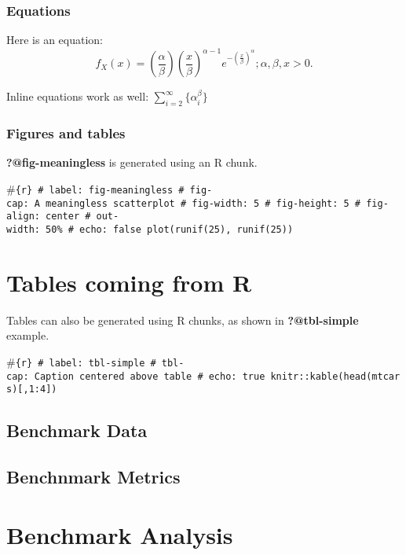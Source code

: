 \documentclass[
  11pt,
  authoryear,
  preprint]{elsarticle}
\begin{document}
\subsubsection{Equations}\label{equations}

Here is an equation: \[ 
  f_{X}(x) = \left(\frac{\alpha}{\beta}\right)
  \left(\frac{x}{\beta}\right)^{\alpha-1}
  e^{-\left(\frac{x}{\beta}\right)^{\alpha}}; 
  \alpha,\beta,x > 0 .
\]

Inline equations work as well: \(\sum_{i = 2}^\infty\{\alpha_i^\beta\}\)

\subsubsection{Figures and tables}\label{figures-and-tables}

\textbf{?@fig-meaningless} is generated using an R chunk.

\#\texttt{\{r\}\ \#\textbar{}\ label:\ fig-meaningless\ \#\textbar{}\ fig-cap:\ A\ meaningless\ scatterplot\ \#\textbar{}\ fig-width:\ 5\ \#\textbar{}\ fig-height:\ 5\ \#\textbar{}\ fig-align:\ center\ \#\textbar{}\ out-width:\ 50\%\ \#\textbar{}\ echo:\ false\ plot(runif(25),\ runif(25))}

\section{Tables coming from R}\label{tables-coming-from-r}

Tables can also be generated using R chunks, as shown in
\textbf{?@tbl-simple} example.

\#\texttt{\{r\}\ \#\textbar{}\ label:\ tbl-simple\ \#\textbar{}\ tbl-cap:\ Caption\ centered\ above\ table\ \#\textbar{}\ echo:\ true\ knitr::kable(head(mtcars){[},1:4{]})}

\subsection{Benchmark Data}\label{benchmark-data}

\subsection{Benchnmark Metrics}\label{benchnmark-metrics}

\section{Benchmark Analysis}\label{benchmark-analysis}
\end{document}
